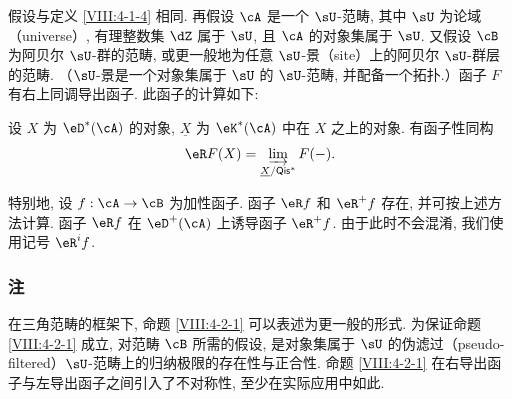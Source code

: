 \begin{proposition}\label{VIII:4-2-1}
假设与定义 \ref{VIII:4-1-4} 相同. 再假设 $\cA$ 是一个 $\sU$-范畴, 其中 $\sU$ 为论域（universe）, 有理整数集 $\dZ$ 属于 $\sU$, 且 $\cA$ 的对象集属于 $\sU$. 又假设 $\cB$ 为阿贝尔 $\sU$-群的范畴, 或更一般地为任意 $\sU$-景（site）上的阿贝尔 $\sU$-群层的范畴. （$\sU$-景是一个对象集属于 $\sU$ 的 $\sU$-范畴, 并配备一个拓扑.）函子 $F$ 有右上同调导出函子. 此函子的计算如下:

设 $X$ 为 $\eD^\ast(\cA)$ 的对象, $\underline X$ 为 $\eK^\ast(\cA)$ 中在 $X$ 之上的对象. 有函子性同构
\[
  \eR F(X) = \varinjlim_{\underline X/\mathsf{Qis}^\ast} F(-) \text{.}
\]
\end{proposition}

特别地, 设 $f:\cA\to \cB$ 为加性函子. 函子 $\eR f$ 和 $\eR^+ f$ 存在, 并可按上述方法计算. 函子 $\eR f$ 在 $\eD^+(\cA)$ 上诱导函子 $\eR^+ f$. 由于此时不会混淆, 我们使用记号 $\eR^i f$.

\subsubsection{注}\label{VIII:4-2-2}

在三角范畴的框架下, 命题 \ref{VIII:4-2-1} 可以表述为更一般的形式. 为保证命题 \ref{VIII:4-2-1} 成立, 对范畴 $\cB$ 所需的假设, 是对象集属于 $\sU$ 的伪滤过（pseudo-filtered）$\sU$-范畴上的归纳极限的存在性与正合性. 命题 \ref{VIII:4-2-1} 在右导出函子与左导出函子之间引入了不对称性, 至少在实际应用中如此.

